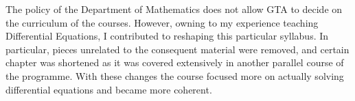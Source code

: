 \documentclass[11pt]{amsart}	%
\begin{document}
The policy of the Department of Mathematics does not allow GTA to decide on the curriculum of the courses. However, owning to my experience teaching Differential Equations, I contributed to reshaping this particular syllabus. In particular, pieces unrelated to the consequent material were removed, and certain chapter was shortened as it was covered extensively in another parallel course of the programme. With these changes the course focused more on actually solving differential equations and became more coherent.
\end{document}

